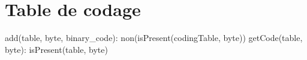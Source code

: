 \section{Table de codage}

\begin{algorithme}
    {add(table, byte, binary\_code): non(isPresent(codingTable, byte))}
    {getCode(table, byte): isPresent(table, byte)}
\end{algorithme}